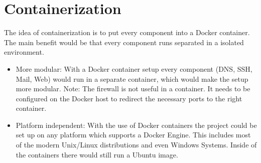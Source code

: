 \section{Containerization}
The idea of containerization is to put every component into a \gls{Docker} container. The main benefit would be that every component runs separated in a isolated environment.

\begin{itemize}
        \item More modular: With a Docker container setup every component (DNS, SSH, Mail, Web) would run in a separate container, which would make the setup more modular. 
			\subitem Note: The firewall is not useful in a container. It needs to be configured on the Docker host to redirect the necessary ports to the right container.
        \item Platform independent: With the use of Docker containers the project could be set up on any platform which supports a Docker Engine. This includes most of the modern Unix/Linux distributions and even Windows Systems. Inside of the containers there would still run a Ubuntu image.
\end{itemize}
